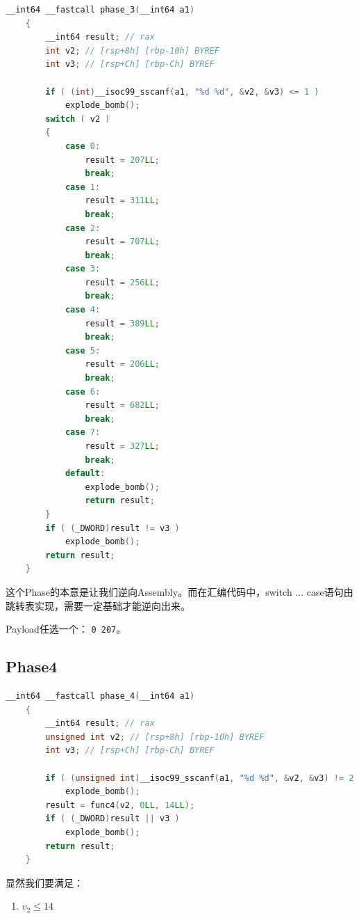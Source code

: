 \documentclass[a4pper,12pt,onecolumn]{article}
\begin{document}
\begin{lstlisting}[language=c, caption=Discompile by IDA Pro]
    __int64 __fastcall phase_3(__int64 a1)
    {
        __int64 result; // rax
        int v2; // [rsp+8h] [rbp-10h] BYREF
        int v3; // [rsp+Ch] [rbp-Ch] BYREF

        if ( (int)__isoc99_sscanf(a1, "%d %d", &v2, &v3) <= 1 )
            explode_bomb();
        switch ( v2 )
        {
            case 0:
                result = 207LL;
                break;
            case 1:
                result = 311LL;
                break;
            case 2:
                result = 707LL;
                break;
            case 3:
                result = 256LL;
                break;
            case 4:
                result = 389LL;
                break;
            case 5:
                result = 206LL;
                break;
            case 6:
                result = 682LL;
                break;
            case 7:
                result = 327LL;
                break;
            default:
                explode_bomb();
                return result;
        }
        if ( (_DWORD)result != v3 )
            explode_bomb();
        return result;
    }
\end{lstlisting}

这个Phase的本意是让我们逆向Assembly。而在汇编代码中，switch ... case语句由跳转表实现，需要一定基础才能逆向出来。

Payload任选一个： \texttt{0 207}。

\subsection{Phase4}

\begin{lstlisting}[language=c]
    __int64 __fastcall phase_4(__int64 a1)
    {
        __int64 result; // rax
        unsigned int v2; // [rsp+8h] [rbp-10h] BYREF
        int v3; // [rsp+Ch] [rbp-Ch] BYREF

        if ( (unsigned int)__isoc99_sscanf(a1, "%d %d", &v2, &v3) != 2 || v2 > 14 )
            explode_bomb();
        result = func4(v2, 0LL, 14LL);
        if ( (_DWORD)result || v3 )
            explode_bomb();
        return result;
    }
\end{lstlisting}

显然我们要满足：

\begin{enumerate}
    \item $ v_2 \leq 14 $
\end{enumerate}
\end{document}

